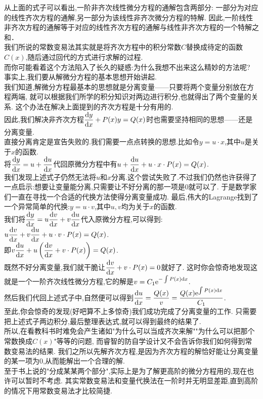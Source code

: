 \documentclass{ctexart}
\begin{document}
\begin{analyze}[关于常数变易法的说明]
    从上面的式子可以看出,一阶非齐次线性微分方程的通解包含两部分:
    一部分为对应的线性齐次方程的通解,另一部分为该线性非齐次微分方程的特解.
    因此,一阶线性非齐次方程的通解等于对应的线性齐次方程的通解与线性非齐次方程的一个特解之和．\\
    我们所说的常数变易法其实就是将齐次方程中的积分常数$C$替换成待定的函数$C(x)$,随后通过回代的方式进行求解的过程.\\
    而你可能看着这个方法陷入了长久的疑惑:为什么我想不出来这么精妙的方法呢?\\
    事实上,我们要从解微分方程的基本思想开始讲起.\\
    我们知道,解微分方程最基本的思想就是分离变量——只要将两个变量分别放在方程两端,
    就可以根据我们所学的积分知识对两边进行积分,也就得出了两个变量的关系.
    这个办法在解决上面提到的齐次方程是十分有用的.\\
    因此,我们解决非齐次方程$\dfrac{\mathrm{d} y}{\mathrm{d} x}+P(x)y=Q(x)$时也需要坚持相同的思想——还是分离变量.\\
    直接分离肯定是宣告失败的.我们需要一点点转换的思想.比如令$y=u\cdot x$,其中$u$是关于$x$的函数.\\
    将$\dfrac{\mathrm{d} y}{\mathrm{d} x}=u+\dfrac{\mathrm{d} u}{\mathrm{d} x}$代回原微分方程中有$u+\dfrac{\mathrm{d} u}{\mathrm{d} x}+u\cdot x\cdot P(x)=Q(x)$.\\
    我们发现上述式子仍然无法将$u$和$x$分离.这个尝试失败了.不过我们仍然也许获得了一点启示:想要让变量能分离,只需要让不好分离的那一项是0就可以了.
    于是数学家们一直在寻找一个合适的代换方法使得分离变量成功.
    最后,伟大的Lagrange找到了一个异常简单的代换:$y=u\cdot v$,其中$u,v$均为关于$x$的函数.\\
    我们将$\dfrac{\mathrm{d} y}{\mathrm{d} x}=u\dfrac{\mathrm{d} v}{\mathrm{d} x}+v\dfrac{\mathrm{d} u}{\mathrm{d} x}$代入原微分方程,可以得到:
    $u\dfrac{\mathrm{d} v}{\mathrm{d} x}+v\dfrac{\mathrm{d} u}{\mathrm{d} x}+u\cdot v\cdot P(x)=Q(x)$.\\
    即$v\dfrac{\mathrm{d} u}{\mathrm{d} x}+u\left(\dfrac{\mathrm{d} v}{\mathrm{d} x}+ v\cdot P(x)\right)=Q(x)$.\\
    既然不好分离变量,我们就干脆让$\dfrac{\mathrm{d} v}{\mathrm{d} x}+ v\cdot P(x)=0$就好了.
    这时你会惊奇地发现这就是一个一阶齐次线性微分方程,它的解是$v=C_1\mathrm{e}^{-\int{P(x)\mathrm{d}x}}$.\\
    然后我们代回上述式子中,自然便可以得到$\dfrac{\mathrm{d} u}{\mathrm{d} x}=\dfrac{Q(x)}{v}=\dfrac{Q(x)\mathrm{e}^{\int{P(x)\mathrm{d}x}}}{C_1}$.\\
    至此,你会惊奇的发现(好吧算不上多惊奇)我们成功完成了分离变量的工作.
    只需要把上述式子两边积分,最后整理表达式,就可以得到最终的结果了.\\
    所以,在看教科书时难免会产生诸如"为什么可以当成齐次来解""为什么可以把那个常数换成$C(x)$"等等的问题,
    而睿智的防自学设计又不会告诉你我们如何得到常数变易法的结果.
    我们之所以先解齐次方程,是因为齐次方程的解恰好能让分离变量的某一项为0,从而能解出一个合理的解.\\
    至于书上说的"分成某某两个部分",实际上是为了解更高阶的微分方程用的,现在也许可以暂时不考虑.
    其实常数变易法和变量代换法在一阶时并无明显差距,直到高阶的情况下用常数变易法才比较简捷.
\end{analyze}
\end{document}
